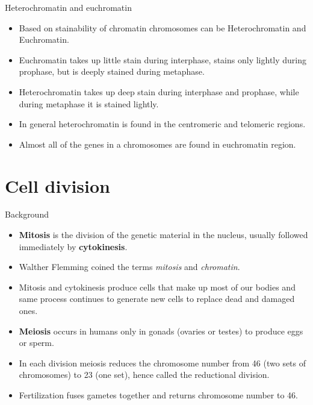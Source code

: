 \documentclass[11pt,ignorenonframetext,aspectratio=169]{beamer}
\providecommand{\tightlist}{%
  \setlength{\itemsep}{0pt}\setlength{\parskip}{0pt}}
\begin{document}
\begin{frame}{Heterochromatin and euchromatin}
\protect\hypertarget{heterochromatin-and-euchromatin}{}
\begin{itemize}
\tightlist
\item
  Based on stainability of chromatin chromosomes can be Heterochromatin
  and Euchromatin.
\item
  Euchromatin takes up little stain during interphase, stains only
  lightly during prophase, but is deeply stained during metaphase.
\item
  Heterochromatin takes up deep stain during interphase and prophase,
  while during metaphase it is stained lightly.
\item
  In general heterochromatin is found in the centromeric and telomeric
  regions.
\item
  Almost all of the genes in a chromosomes are found in euchromatin
  region.
\end{itemize}
\end{frame}

\hypertarget{cell-division}{%
\section{Cell division}\label{cell-division}}

\begin{frame}{Background}
\protect\hypertarget{background-1}{}
\begin{itemize}
\tightlist
\item
  \textbf{Mitosis} is the division of the genetic material in the
  nucleus, usually followed immediately by \textbf{cytokinesis}.
\item
  Walther Flemming coined the terms \emph{mitosis} and \emph{chromatin}.
\item
  Mitosis and cytokinesis produce cells that make up most of our bodies
  and same process continues to generate new cells to replace dead and
  damaged ones.
\item
  \textbf{Meiosis} occurs in humans only in gonads (ovaries or testes)
  to produce eggs or sperm.
\item
  In each division meiosis reduces the chromosome number from 46 (two
  sets of chromosomes) to 23 (one set), hence called the reductional
  division.
\item
  Fertilization fuses gametes together and returns chromosome number to
  46.
\end{itemize}
\end{frame}
\end{document}
